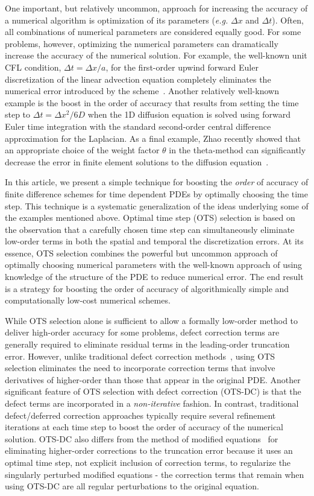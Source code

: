 \documentclass[fleqn,12pt,twoside]{article}
\def\dt{\Delta t}
\def\dx{\Delta x}
\def\eg{\emph{e.g. }}
\begin{document}
One important, but relatively uncommon, approach for increasing the accuracy
of a numerical algorithm is optimization of its parameters
(\eg $\dx$ and $\dt$).  Often, all combinations of numerical parameters are
considered equally good.  For some problems, however, optimizing the numerical
parameters can dramatically increase the accuracy of the numerical solution.
For example, the well-known unit CFL condition, $\dt = \dx/a$, for the
first-order upwind forward Euler discretization of the linear advection
equation completely eliminates the numerical error introduced by the 
scheme~\cite{leveque_book_2002}.  Another relatively well-known example is the
boost in the order of accuracy that results from setting the time step to 
$\dt = \dx^2/6D$ when the 1D diffusion equation is solved using forward Euler 
time integration with the standard second-order central difference 
approximation for the Laplacian.  As a final example, Zhao recently showed
that an appropriate choice of the weight factor $\theta$ in the theta-method
can significantly decrease the error in finite element solutions to the
diffusion equation~\cite{zhao_2006}. 

In this article, we present a simple technique for boosting the \emph{order} of 
accuracy of finite difference schemes for time dependent PDEs by optimally 
choosing the time step.  This technique is a systematic generalization of
the ideas underlying some of the examples mentioned above.  Optimal time step
(OTS) selection is based on the observation that a carefully chosen time step
can simultaneously eliminate low-order terms in both the spatial and temporal
the discretization errors.  At its essence, OTS selection combines the 
powerful but uncommon approach of optimally choosing numerical parameters 
with the well-known approach of using knowledge of the structure of the
PDE to reduce numerical error.  The end result is a strategy for boosting
the order of accuracy of algorithmically simple and computationally low-cost
numerical schemes.

While OTS selection alone is sufficient to allow a formally low-order method to
deliver high-order accuracy for some problems, defect correction terms are
generally required to eliminate residual terms in the leading-order truncation
error.  However, unlike traditional defect correction 
methods~\cite{pereyra_1968,stetter_1978,gustafsson_2002,kress_2002,kress_2006}, 
using OTS selection eliminates the need to incorporate correction terms that
involve derivatives of higher-order than those that appear in the original PDE.
Another significant feature of OTS selection with defect correction (OTS-DC)
is that the defect terms are incorporated in a \emph{non-iterative} fashion.
In contrast, traditional defect/deferred correction approaches typically
require several refinement iterations at each time step to boost the order of
accuracy of the numerical solution.  OTS-DC also differs from the method of
modified equations~\cite{griffiths_1986} for eliminating higher-order
corrections to the truncation error because it uses an optimal time
step, not explicit inclusion of correction terms, to regularize the
singularly perturbed modified equations - the correction terms that remain
when using OTS-DC are all regular perturbations to the original equation.
\end{document}
